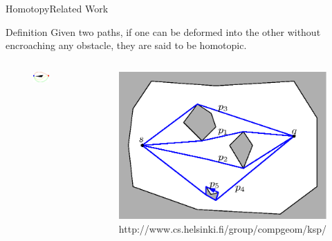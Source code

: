\begin{frame}{Homotopy}{Related Work}

\begin{block}{Definition}
Given two paths, if one can be deformed into the other without encroaching any obstacle, they are said to be homotopic.\footnotemark
\end{block}

\begin{columns}
\begin{figure}
	\centering
	\includegraphics[width=.8\linewidth]{figure/path_homotopy}
\end{figure}

\begin{figure}
	\centering
	\includegraphics[width=.8\linewidth]{figure/path_homotopy_map}
	\caption{\tiny http://www.cs.helsinki.fi/group/compgeom/ksp/}
\end{figure}

\end{columns}


\end{frame}

